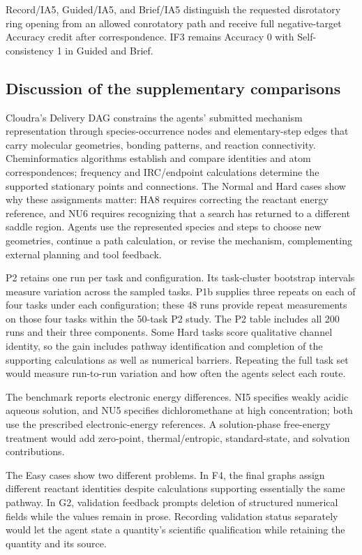 Record/IA5, Guided/IA5, and Brief/IA5 distinguish the requested disrotatory ring opening from an allowed conrotatory path and receive full negative-target Accuracy credit after correspondence. IF3 remains Accuracy 0 with Self-consistency 1 in Guided and Brief.




\subsection{Discussion of the supplementary comparisons}

Cloudra's Delivery DAG constrains the agents' submitted mechanism representation through species-occurrence nodes and elementary-step edges that carry molecular geometries, bonding patterns, and reaction connectivity. Cheminformatics algorithms establish and compare identities and atom correspondences; frequency and IRC/endpoint calculations determine the supported stationary points and connections. The Normal and Hard cases show why these assignments matter: HA8 requires correcting the reactant energy reference, and NU6 requires recognizing that a search has returned to a different saddle region. Agents use the represented species and steps to choose new geometries, continue a path calculation, or revise the mechanism, complementing external planning and tool feedback.\citep{valmeekam2023planning,ref18,huang2024selfcorrect}

P2 retains one run per task and configuration. Its task-cluster bootstrap intervals measure variation across the sampled tasks. P1b supplies three repeats on each of four tasks under each configuration; these 48 runs provide repeat measurements on those four tasks within the 50-task P2 study. The P2 table includes all 200 runs and their three components. Some Hard tasks score qualitative channel identity, so the gain includes pathway identification and completion of the supporting calculations as well as numerical barriers. Repeating the full task set would measure run-to-run variation and how often the agents select each route.

The benchmark reports electronic energy differences. NI5 specifies weakly acidic aqueous solution, and NU5 specifies dichloromethane at high concentration; both use the prescribed electronic-energy references. A solution-phase free-energy treatment would add zero-point, thermal/entropic, standard-state, and solvation contributions.

The Easy cases show two different problems. In F4, the final graphs assign different reactant identities despite calculations supporting essentially the same pathway. In G2, validation feedback prompts deletion of structured numerical fields while the values remain in prose. Recording validation status separately would let the agent state a quantity's scientific qualification while retaining the quantity and its source.
